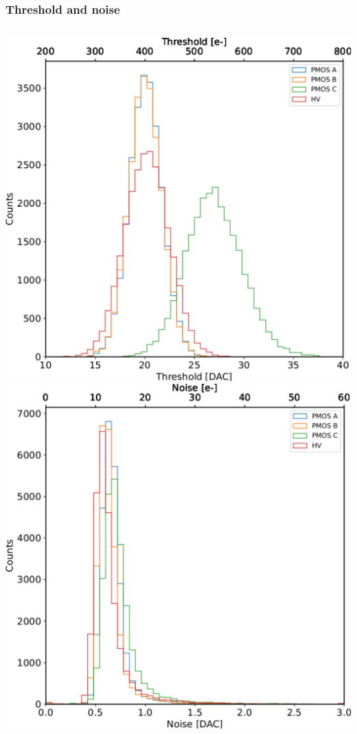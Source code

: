     \begin{frame}
        \frametitle{Threshold and noise}
        \begin{columns}
                \includegraphics[width=1.1\linewidth]{figures/charaterization/threshold_histogram.pdf}
                \includegraphics[width=1.1\linewidth]{figures/charaterization/noise_histogram.pdf} 

\end{columns}
\end{frame}
